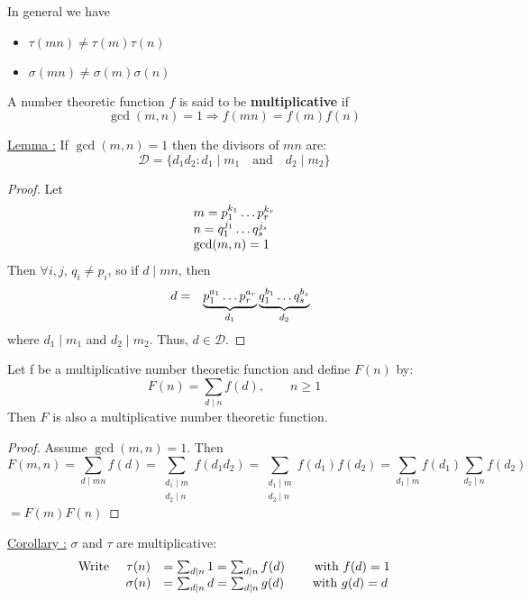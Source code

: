 \documentclass{report}
\begin{document}
In general we have 
	\begin{itemize}
		\item $\tau(mn) \neq \tau(m) \tau(n)$
		\item $\sigma(mn) \neq \sigma(m) \sigma(n)$
	\end{itemize}
\begin{defi}
	A number theoretic function $f$ is said to be \textbf{multiplicative} if
		\[\gcd(m,n)=1 \Rightarrow f(mn)=f(m)f(n) \]
\end{defi}
\underline{Lemma :} If $\gcd(m,n)=1$ then the divisors of $mn$ are:
	\[\mathcal{D} = \{d_1 d_2 : d_1 \mid m_1 \quad \text{and}\quad d_2 \mid m_2 \} \]
\begin{proof}
	Let
	\[
	\begin{array}{l c l}
		m=p_1^{k_1} \dots p_r^{k_r}\\
		n=q_1^{j_1} \dots q_s^{j_s}\\
		\gcd(m,n)=1\\
	\end{array}
	\]
	Then $\forall i,j$, $q_i \neq p_i$, so if $d\mid mn$, then
		\[
			\begin{array}{l l l}
				&d=&\underbrace{p_1^{a_1} \dots p_r^{a_r}}_{d_1} \underbrace{q_1^{b_1} \dots q_s^{b_s}}_{d_2}
			\end{array}
		\]
	where $d_1\mid m_1$ and $d_2\mid m_2$. Thus, $d\in \mathcal{D}$.
\end{proof}
\begin{thm} Let f be a multiplicative number theoretic function and define $F(n)$ by:
			\[F(n)= \sum_{d\mid n} f(d), \qquad n \geq 1 \]
			Then $F$ is also a multiplicative number theoretic function.
\end{thm}
\begin{proof}
	Assume $\gcd(m,n)=1$. Then
		\[ F(m,n)=\sum_{d \mid mn} f(d) = 
		\sum_{\substack{d_1 \mid m\\ d_2 \mid n}} f(d_1d_2)= \sum_{\substack{d_1 \mid m\\ d_2 \mid n}} f(d_1)f(d_2)=\sum_{d_1 \mid m} f(d_1) \sum_{d_2 \mid n} f(d_2)
		\]
	$=F(m)F(n)$
\end{proof}
\underline{Corollary :} $\sigma$ and $\tau$ are multiplicative:\\
		\[
			\begin{array}{r c l}
				\text{Write }&\tau(n)& =\sum_{d\mid n} 1 = \sum_{d \mid n} f(d) \qquad \text{ with }f(d)=1\\
				&\sigma(n)&= \sum_{d \mid n} d = \sum_{d\mid n} g(d) \qquad \; \text{with } g(d)=d\\
			\end{array}
		\]
\newpage 
		
\end{document}
